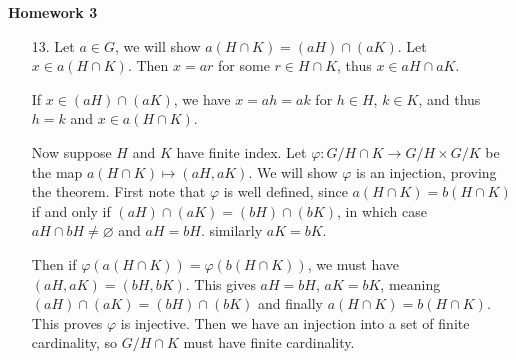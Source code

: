 \documentclass[11pt, reqno]{article}
\theoremstyle{plain}
\theoremstyle{definition}
\theoremstyle{remark}
\renewcommand{\phi}{\varphi}
\renewcommand{\emptyset}{\varnothing}
\begin{document}
\topmargin=-40pt
\renewcommand{\headrulewidth}{1pt}
\renewcommand{\headsep}{20pt}
\thispagestyle{fancy}

{\Huge \bfseries \noindent Homework 3}

\begin{enumerate}
    \item[13.] Let $a \in G$, we will show $a(H \cap K) = (aH) \cap (aK)$. Let $x \in a(H \cap K)$.
    Then $x = ar$ for some $r \in H \cap K$, thus $x \in aH \cap aK$. 

    If $x \in (aH) \cap (aK)$, we have $x = ah = ak$ for $h \in H$, $k \in K$, and thus $h = k$ and 
    $x \in a(H \cap K)$. 

    Now suppose $H$ and $K$ have finite index. Let $\phi: G/H\cap K \rightarrow G/H \times G/K$ be 
    the map $a(H\cap K) \mapsto (aH, aK)$. We will show $\phi$ is an injection, proving the theorem. 
    First note that $\phi$ is well defined, since $a(H \cap K) = b(H \cap K)$ if and only if 
    $(aH) \cap (aK) = (bH) \cap (bK)$, in which case $aH \cap bH \neq \emptyset$ and $aH = bH$.
    similarly $aK = bK$. 

    Then if $\phi(a(H\cap K)) = \phi(b(H \cap K))$, we must have $(aH, aK) = (bH, bK)$. This gives
    $aH = bH$, $aK = bK$, meaning $(aH) \cap (aK) = (bH) \cap (bK)$ and finally $a(H\cap K) = b(H \cap K)$.
    This proves $\phi$ is injective. Then we have an injection into a set of finite cardinality, so $G/H\cap K$
    must have finite cardinality. 
\end{enumerate}
\end{document}
